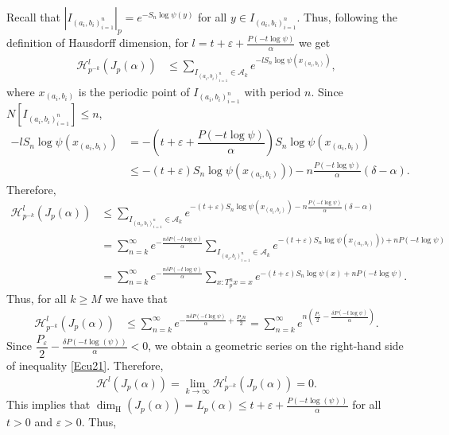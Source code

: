 \documentclass[11pt]{amsart}
\theoremstyle{remark}
\numberwithin{equation}{section}
\begin{document}
Recall that $|I_{(a_{i},b_{i})_{i=1}^{n}}|_{p}=e^{-S_{n}\log\psi(y)}$ for all $y\in I_{(a_{i},b_{i})_{i=1}^{n}}$. Thus, following the definition of Hausdorff dimension, for $l=t+\varepsilon+\frac{P(-t\log \psi)}{\alpha}$ we get
\begin{align*}
    \mathcal{H}^{l}_{p^{-k}}(J_{p}(\alpha))
    &\leq \sum_{I_{(a_{i},b_{i})_{i=1}^{n}}\in \mathcal{A}_{k}}e^{-lS_{n}\log\psi(x_{(a_{i},b_{i})})},
\end{align*}where $x_{(a_{i},b_{i})}$ is the periodic point of $I_{(a_{i},b_{i})^{n}_{i=1}}$ with period $n$. Since $N[I_{(a_{i},b_{i})_{i=1}^{n}}]\leq n$,
\begin{align*}
    -lS_{n}\log\psi(x_{(a_{i},b_{i})})&=-\left(t+\varepsilon+\dfrac{P(-t\log\psi)}{\alpha}\right)S_{n}\log\psi(x_{(a_{i},b_{i})})\\
    & \leq -(t+\varepsilon)S_{n}\log\psi(x_{(a_{i},b_{i})}))-n\frac{P(-t\log\psi)}{\alpha}(\delta-\alpha).
\end{align*} Therefore,
\begin{align*}
    \mathcal{H}^{l}_{p^{-k}}(J_{p}(\alpha))&\leq \sum_{I_{(a_{i},b_{i})_{i=1}^{n}}\in \mathcal{A}_{k}}e^{-(t+\varepsilon)S_{n}\log\psi(x_{(a_{i},b_{i})})-n\frac{P(-t\log\psi)}{\alpha}(\delta-\alpha)}\\
    & = \sum^{\infty}_{n=k}e^{-\frac{n\delta P(-t\log\psi)}{\alpha}}\sum_{I_{(a_{i},b_{i})_{i=1}^{n}}\in \mathcal{A}_{k}}e^{-(t+\varepsilon)S_{n}\log\psi(x_{(a_{i},b_{i})}))+nP(-t\log\psi)}\\
    & = \sum^{\infty}_{n=k}e^{-\frac{n\delta P(-t\log\psi)}{\alpha}}\sum_{x:T_{p}^{n}x=x}e^{-(t+\varepsilon)S_{n}\log\psi(x)+nP(-t\log\psi)}.
\end{align*}Thus, for all $k\geq M$ we have that 
\begin{align}\label{Ecu21}
    \mathcal{H}^{l}_{p^{-k}}(J_{p}(\alpha))&\leq \sum^{\infty}_{n=k}e^{-\frac{n\delta P(-t\log\psi)}{\alpha}+\frac{P_{\varepsilon}n}{2}}=\sum^{\infty}_{n=k}e^{n(\frac{P_{\varepsilon}}{2}-\frac{\delta P(-t\log\psi )}{\alpha})}.
\end{align} Since $\dfrac{P_{\varepsilon}}{2}-\frac{\delta P(-t\log(\psi))}{\alpha}<0$, we obtain a geometric series on the right-hand side of inequality \eqref{Ecu21}. Therefore,
\begin{align*}
    \mathcal{H}^{l}(J_{p}(\alpha))=\lim_{k\to \infty}\mathcal{H}^{l}_{p^{-k}}(J_{p}(\alpha))=0.
\end{align*}This implies that $\dim_{\mathrm{H}}(J_{p}(\alpha))=L_{p}(\alpha)\leq t+\varepsilon+\frac{P(-t\log(\psi))}{\alpha}$ for all $t>0$ and $\varepsilon>0$. Thus,
\end{document}
